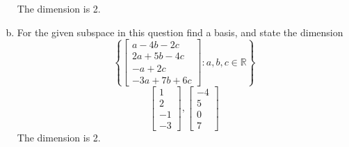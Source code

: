 \begin{enumerate}[(a)]
$$    $$
    The dimension is 2.
    \item For the given subspace in this question find a basis, and state the dimension
    $$
    \left\{\left[\begin{array}{c}a-4 b-2 c \\ 2 a+5 b-4 c \\ -a+2 c \\ -3 a+7 b+6 c\end{array}\right]: a, b, c \in \mathbb{R}\right\}
    $$
    $$
    \left[\begin{array}{r}1 \\ 2 \\ -1 \\ -3\end{array}\right],\left[\begin{array}{r}-4 \\ 5 \\ 0 \\ 7\end{array}\right]
    $$
    The dimension is 2.
    

\end{enumerate}
